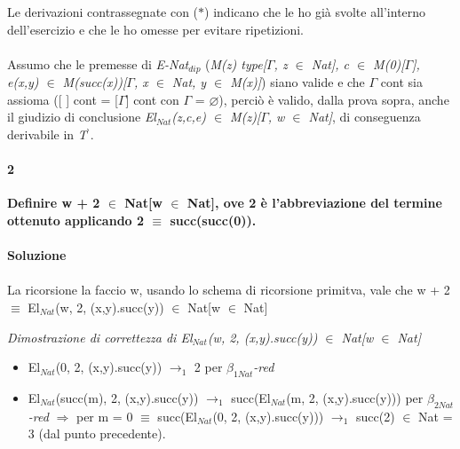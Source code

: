 \vspace{0.5cm}
\noindent
\normalsize Le derivazioni contrassegnate con ($\ast$) indicano che le ho gi\`a svolte all'interno dell'esercizio e che le ho omesse per evitare ripetizioni.\\\\
\noindent
Assumo che le premesse di \textit{E-Nat$_{dip}$} (\textit{M(z) type[$\Gamma$, z $\in$ Nat], c $\in$ M(0)[$\Gamma$], e(x,y) $\in$ M(succ(x))[$\Gamma$, x $\in$ Nat, y $\in$ M(x)]}) siano valide e che $\Gamma$ cont sia assioma ([ ] cont = [$\Gamma$] cont con $\Gamma$ = $\varnothing$), perci\`o \`e valido, dalla prova sopra, anche il giudizio di conclusione \textit{El$_{Nat}$(z,c,e) $\in$ M(z)[$\Gamma$, w $\in$ Nat]}, di conseguenza derivabile in \textit{T$^\backprime$}.

\paragraph{2}
\textbf{Definire w + 2 $\in$ Nat[w $\in$ Nat], ove 2 \`e l'abbreviazione del termine ottenuto applicando 2 $\equiv$ succ(succ(0)).}
\\\\
\textbf{Soluzione}\\\\
La ricorsione la faccio w, usando lo schema di ricorsione primitva, vale che w + 2 $\equiv$ El$_{Nat}$(w, 2, (x,y).succ(y)) $\in$ Nat[w $\in$ Nat]

\small
\begin{adjustwidth}{-5em}{}
\begin{prooftree}
\end{prooftree}
\end{adjustwidth}
\noindent
\normalsize \textit{Dimostrazione di correttezza di El$_{Nat}$(w, 2, (x,y).succ(y)) $\in$ Nat[w $\in$ Nat]}
\begin{itemize}
\item El$_{Nat}$(0, 2, (x,y).succ(y)) $\rightarrow_1$ 2 per \textit{$\beta_{1Nat}$-red}
\item El$_{Nat}$(succ(m), 2, (x,y).succ(y)) $\rightarrow_1$ succ(El$_{Nat}$(m, 2, (x,y).succ(y))) per \textit{$\beta_{2Nat}$-red} $\Rightarrow$ per m = 0 $\equiv$ succ(El$_{Nat}$(0, 2, (x,y).succ(y))) $\rightarrow_1$ succ(2) $\in$ Nat = 3 (dal punto precedente).
\end{itemize}

